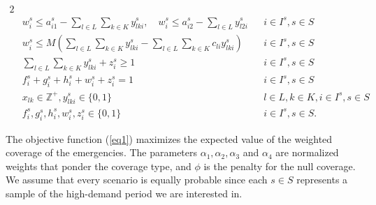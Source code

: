 \begin{alignat}{2}
    \label{eq10}\\
   & w_i^s \leq  a_{i1}^s - \sum_{l \in L} \sum_{k \in K} y_{lki}^s, \quad w_i^s \leq   a_{i2}^s - \sum_{l \in L}   y_{l2i}^s &&  i \in I^s,  s\in S
    \label{eq11}\\
   & w_i^s \leq M \left( \sum_{l \in L} \sum_{k \in K} y_{lki}^s - \sum_{l \in L} \sum_{k \in K} c_{li} y_{lki}^s \right)  && i \in I^s,  s\in S 
    \label{eq12}\\
  & \sum_{l \in L} \sum_{k \in K} y_{lki}^s + z_i^s \geq 1 && i \in I^s,   s \in S  \label{eq13}\\
    & f_i^s + g_i^s + h_i^s + w_i^s + z_i^s = 1  && i \in I^s,  s \in S 
    \label{eq14}\\
  &  x_{lk} \in \mathbb{Z}^+ , y_{lki}^s \in \{ 0,1 \} && l \in L,   k \in K, i \in I^s, s \in S
    \label{eq15}\\
    & f_i^s, g_i^s, h_i^s, w_i^s, z_i^s \in \{ 0,1 \}  && i \in I^s,   s \in S.
    \label{eq16}
\end{alignat}

The objective function (\ref{eq1}) maximizes the expected value of the weighted coverage of the emergencies. %
The parameters $\alpha_1 , \alpha_2, \alpha_3$ and $\alpha_4$ are normalized weights that ponder the coverage type, and $\phi$ is the penalty for the null coverage. We assume that every scenario is equally probable since each $s\in S$ represents a sample of the high-demand period we are interested in.

